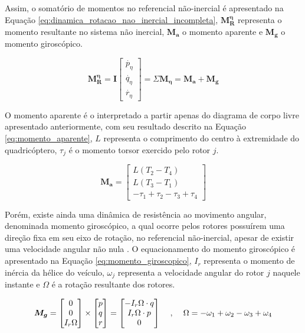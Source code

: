 \documentclass[main.tex]{subfiles}
\begin{document}
Assim, o somatório de momentos no referencial não-inercial é apresentado na Equação \ref{eq:dinamica_rotacao_nao_inercial_incompleta}, $	\boldsymbol{M^\eta_R}$ representa o momento resultante no sistema não inercial, $\boldsymbol{M_a}$ o momento aparente e $\boldsymbol{M_g}$ o momento giroscópico.

\begin{equation}\label{eq:dinamica_rotacao_nao_inercial_incompleta}
	\boldsymbol{M^\eta_R} = \boldsymbol{I} \begin{bmatrix}
		\dot{p_\eta}\\
		\dot{q_\eta}\\
		\dot{r_\eta}
	\end{bmatrix} = \Sigma \boldsymbol{M_\eta} = \boldsymbol{M_a} + \boldsymbol{M_g}
\end{equation}

O momento aparente é o interpretado a partir apenas do diagrama de corpo livre apresentado anteriormente, com seu resultado descrito na Equação \ref{eq:momento_aparente}, $L$ representa o comprimento do centro à extremidade do quadricóptero, $\tau_j$ é o momento torsor exercido pelo rotor $j$.

\begin{equation}\label{eq:momento_aparente}
	\boldsymbol{M_a} =
	\begin{bmatrix}
		L (T_2 - T_4)\\
		L (T_3 - T_1)\\
		-\tau_1 + \tau_2 - \tau_3 + \tau_4
	\end{bmatrix}
\end{equation}

Porém, existe ainda uma dinâmica de resistência ao movimento angular, denominada momento giroscópico, a qual ocorre pelos rotores possuírem uma direção fixa em seu eixo de rotação, no referencial não-inercial, apesar de existir uma velocidade angular não nula \cite{hibbeler2011engineering}. O equacionamento do momento giroscópico é apresentado na Equação \ref{eq:momento_giroscopico}, $I_r$ representa o momento de inércia da hélice do veículo, $\omega_j$ representa a velocidade angular do rotor $j$ naquele instante e $\Omega$ é a rotação resultante dos rotores.

\begin{equation}\label{eq:momento_giroscopico}
	\boldsymbol{M_g} = \begin{bmatrix}
		0\\
		0\\
		I_r\Omega
	\end{bmatrix} \times \begin{bmatrix}
		p\\
		q\\
		r
	\end{bmatrix} = \begin{bmatrix}
		- I_r\Omega\cdot q\\
		I_r\Omega\cdot p\\
		0
	\end{bmatrix} \hspace{0.4cm} , \hspace{0.4cm} \Omega = -\omega_1 + \omega_2 - \omega_3 + \omega_4
\end{equation}
\end{document}
